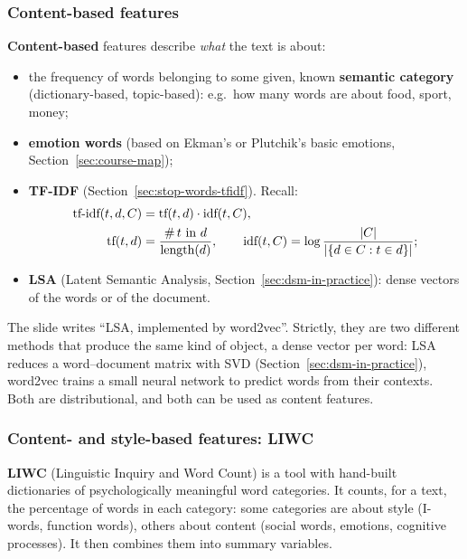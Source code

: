 \subsubsection{Content-based features}

\textbf{Content-based} features describe \emph{what} the text is about:
\begin{itemize}[nosep]
  \item the frequency of words belonging to some given, known \textbf{semantic category}
        (dictionary-based, topic-based): e.g.\ how many words are about food, sport,
        money;
  \item \textbf{emotion words} (based on Ekman's or Plutchik's basic emotions,
        Section~\ref{sec:course-map});
  \item \textbf{TF-IDF} (Section~\ref{sec:stop-words-tfidf}). Recall:
        \begin{align*}
          \text{tf-idf}(t, d, C) &= \text{tf}(t, d)\cdot\text{idf}(t, C),\\
          \text{tf}(t, d) &= \frac{\#\,t \text{ in } d}{\text{length}(d)}, \qquad
          \text{idf}(t, C) = \log\frac{\lvert C\rvert}{\lvert \{d \in C : t \in d\}\rvert};
        \end{align*}
  \item \textbf{LSA} (Latent Semantic Analysis, Section~\ref{sec:dsm-in-practice}):
        dense vectors of the words or of the document.
\end{itemize}

\begin{nbwarning}
The slide writes ``LSA, implemented by word2vec''. Strictly, they are two different
methods that produce the same kind of object, a dense vector per word: LSA reduces a
word--document matrix with SVD (Section~\ref{sec:dsm-in-practice}), word2vec trains a
small neural network to predict words from their contexts. Both are distributional, and
both can be used as content features.
\end{nbwarning}

\subsubsection{Content- and style-based features: LIWC}

\textbf{LIWC} (Linguistic Inquiry and Word Count) is a tool with hand-built dictionaries
of psychologically meaningful word categories. It counts, for a text, the percentage of
words in each category: some categories are about style (I-words, function words),
others about content (social words, emotions, cognitive processes). It then combines
them into summary variables.

